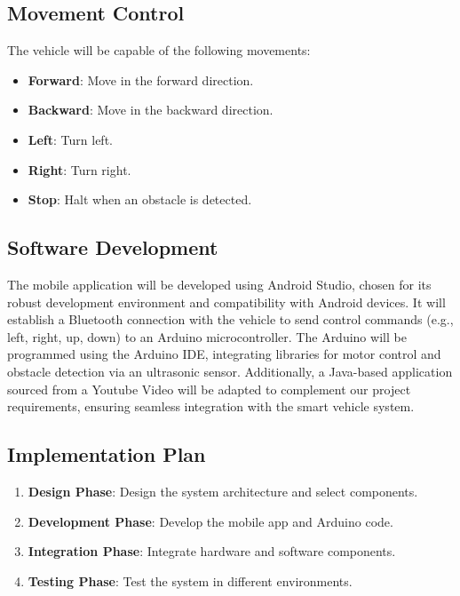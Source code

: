 \documentclass[12pt,a4paper]{article}
\begin{document}
\subsection{Movement Control}
The vehicle will be capable of the following movements:
\begin{itemize}
    \item \textbf{Forward}: Move in the forward direction.
    \item \textbf{Backward}: Move in the backward direction.
    \item \textbf{Left}: Turn left.
    \item \textbf{Right}: Turn right.
    \item \textbf{Stop}: Halt when an obstacle is detected.
\end{itemize}

\subsection{Software Development}
The mobile application will be developed using Android Studio, chosen for its robust development environment and compatibility with Android devices. It will establish a Bluetooth connection with the vehicle to send control commands (e.g., left, right, up, down) to an Arduino microcontroller. The Arduino will be programmed using the Arduino IDE, integrating libraries for motor control and obstacle detection via an ultrasonic sensor. Additionally, a Java-based application sourced from a Youtube Video will be adapted to complement our project requirements, ensuring seamless integration with the smart vehicle system.

\subsection{Implementation Plan}
\begin{enumerate}
    \item \textbf{Design Phase}: Design the system architecture and select components.
    \item \textbf{Development Phase}: Develop the mobile app and Arduino code.
    \item \textbf{Integration Phase}: Integrate hardware and software components.
    \item \textbf{Testing Phase}: Test the system in different environments.
\end{enumerate}


\end{document}

